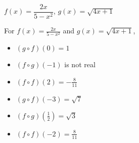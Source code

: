 {$f(x) = \dfrac{2x}{5-x^2}$, $g(x) = \sqrt{4x+1}$}
{For  $f(x) = \frac{2x}{5-x^2}$ and $g(x) = \sqrt{4x+1}$,
\begin{multicols}{2}

\begin{itemize}

\item  $(g\circ f)(0) = 1$

\item  $(f\circ g)(-1)$ is not real

\item  $(f \circ f)(2) = -\frac{8}{11}$

\item  $(g\circ f)(-3) = \sqrt{7}$

\item  $(f\circ g)\left(\frac{1}{2}\right) = \sqrt{3}$

\item  $(f \circ f)(-2) = \frac{8}{11}$

\end{itemize}

\end{multicols}}